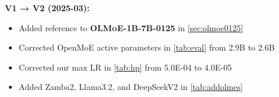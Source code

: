 \documentclass{article}
\newcommand{\modelsmallnew}{\textbf{\textsc{OLMoE-1B-7B-0125}}}
\begin{document}
\textbf{V1 → V2 (2025-03):}

\begin{itemize}
    \item Added reference to \modelsmallnew{} in \autoref{sec:olmoe0125}
    \item Corrected OpenMoE active parameters in \autoref{tab:eval} from 2.9B to 2.6B
    \item Corrected our max LR in \autoref{tab:hp} from 5.0E-04 to 4.0E-05
    \item Added Zamba2, Llama3.2, and DeepSeekV2 in \autoref{tab:addolmes}
\end{itemize}
\end{document}
